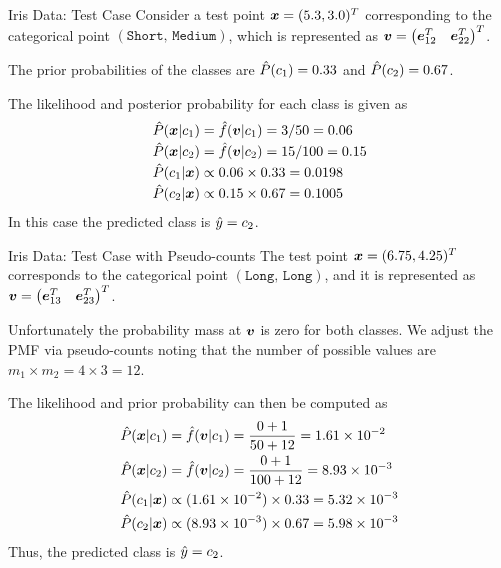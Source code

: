\begin{frame}{Iris Data: Test Case}
 Consider a test point ${\boldsymbol x}=(5.3,3.0)^T$ corresponding to
    the categorical
    point $(\texttt{Short, Medium})$, which is represented as
    ${\boldsymbol v} = \begin{pmatrix} {\boldsymbol e}_{12}^T & {\boldsymbol e}_{22}^T \end{pmatrix}^T$.

	\medskip
The prior probabilities of the classes are $\hat{P}(c_1) = 0.33$ and $\hat{P}(c_2) = 0.67$.

 The likelihood
    and posterior probability for each class is given as
    \begin{align*}
        \hat{P}({\boldsymbol x}|c_1) & = \kern3pt\hat{\kern-3pt f}({\boldsymbol v}|c_1) = 3/50 = 0.06\\[-2pt]
        \hat{P}({\boldsymbol x}|c_2) & = \kern3pt\hat{\kern-3pt f}({\boldsymbol v}|c_2) = 15/100 = 0.15\\[-2pt]
        \hat{P}(c_1|{\boldsymbol x}) & \propto 0.06 \times 0.33 = 0.0198\\[-2pt]
        \hat{P}(c_2|{\boldsymbol x}) & \propto 0.15 \times 0.67 = 0.1005
    \end{align*}
    In this case the predicted class is $\hat{y} = c_2$.
\end{frame}


\begin{frame}{Iris Data: Test Case with Pseudo-counts}
    The test point ${\boldsymbol x}=(6.75,4.25)^T$
    corresponds to the categorical
    point $(\texttt{Long, Long})$, and it is represented as
    ${\boldsymbol v} = \begin{pmatrix} {\boldsymbol e}_{13}^T & {\boldsymbol e}_{23}^T \end{pmatrix}^T$. 
	
\medskip
	Unfortunately the
    probability mass at ${\boldsymbol v}$ is zero for both classes.
    We adjust the PMF via pseudo-counts noting that the number 
	of possible
    values are $m_1 \times m_2 = 4 \times 3 = 12$.

	\medskip
    The likelihood and prior probability
    can then be computed as
    \begin{align*}
        \hat{P}({\boldsymbol x}|c_1) & = \kern3pt\hat{\kern-3pt f}({\boldsymbol v}|c_1) = {0+1\over 50+12} = 1.61
        \times 10^{-2}\\
        \hat{P}({\boldsymbol x}|c_2) & = \kern3pt\hat{\kern-3pt f}({\boldsymbol v}|c_2) = {0+1 \over 100+12} =
        8.93 \times 10^{-3}\\
        \hat{P}(c_1|{\boldsymbol x}) & \propto (1.61 \times 10^{-2}) \times 0.33 =
        5.32 \times 10^{-3}\\
        \hat{P}(c_2|{\boldsymbol x}) & \propto (8.93 \times 10^{-3}) \times 0.67 =
        5.98 \times 10^{-3}
    \end{align*}
    Thus, the predicted class is $\hat{y} = c_2$.
  \end{frame}


